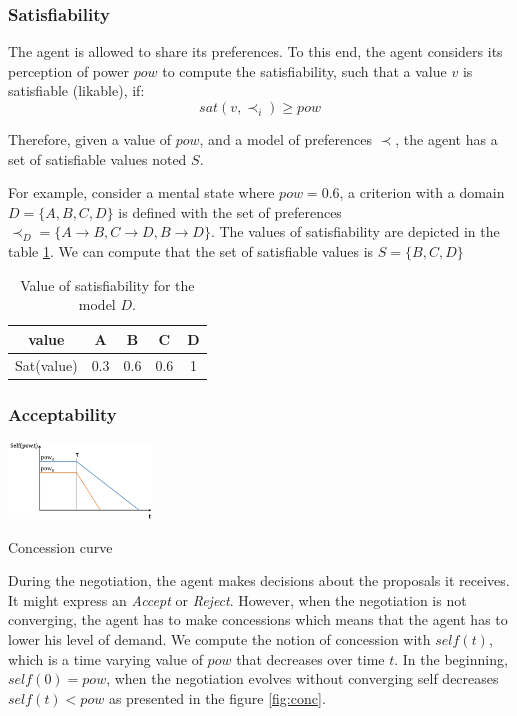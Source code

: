 \documentclass[sigconf]{aamas}  %
\begin{document}
	\subsubsection{Satisfiability }
	\label{sec:sat}
	The agent is allowed to share its preferences. %
	To this end, the agent considers its perception of power $pow$ to compute the satisfiability, such that a value $v$ is satisfiable (likable), if:  
	\begin{equation}
	sat(v, \prec_i) \geq pow
	\end{equation}
	
	Therefore, given a value of $pow$, and a model of preferences $\prec$, the agent has a set of satisfiable values noted $S$. 
	
	\par For example, consider a mental state where $pow =0.6$, a criterion with a domain $D =\{A, B, C, D\}$ is defined with the set of preferences $ \prec_D = \{A \rightarrow  B, C \rightarrow  D , B \rightarrow D \}$. The values of satisfiability are depicted in the table \ref{sat}. We can compute that the set of satisfiable values is $ S = \{B, C, D\}$ 
	\begin{table}
		\centering
		\begin{tabular}{ |c|c|c|c|c| }
			\hline				
			value & A & B & C & D \\
			\hline
			
			\hline
			Sat(value) & 0.3 & 0.6 & 0.6 & 1 \\
			\hline
			
		\end{tabular}
		\caption{Value of satisfiability for the model $D$.}
		\label{sat}
	\end{table}
	
	
	\subsubsection{Acceptability}
	
	\begin{floatingfigure}[r]{1.5in}
		\includegraphics[width=1.5in]{figs/sv3.png}
		\caption{\label{fig:conc}Concession curve}
	\end{floatingfigure} 
	
	During the negotiation, the agent makes decisions about the proposals it receives. It might express an \emph{Accept} or \emph{Reject}. However, when the negotiation is not converging, the agent has to make concessions which means that the agent has to lower his level of demand. 
	We compute the notion of concession with $self(t)$, which is a time varying value of $pow$ that decreases over time $t$. In the beginning, $self(0) = pow$, when the negotiation evolves without converging self decreases $self(t) < pow$ as presented in the figure \ref{fig:conc}.
	
\end{document}
